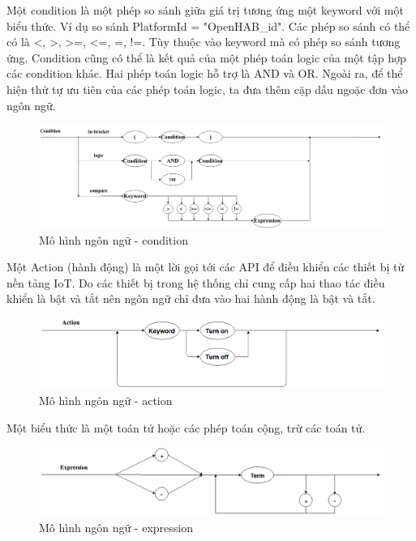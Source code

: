 Một condition là một phép so sánh giữa giá trị tương ứng một keyword với một biểu thức. Ví dụ so sánh PlatformId = "OpenHAB\_id". Các phép so sánh có thể có là <, >, >=, <=, =, !=. Tùy thuộc vào keyword mà có phép so sánh tương ứng. Condition cũng có thể là kết quả của một phép toán logic của một tập hợp các condition khác. Hai phép toán logic hỗ trợ là AND và OR. Ngoài ra, để thể hiện thứ tự ưu tiên của các phép toán logic, ta đưa thêm cặp dấu ngoặc đơn vào ngôn ngữ.

\begin{figure}[h!]
	\center
	\includegraphics[scale=0.3]{image/language_model-condition}
	\caption{Mô hình ngôn ngữ - condition}
\end{figure}


Một Action (hành động) là một lời gọi tới các API để điều khiển các thiết bị từ nền tảng IoT. Do các thiết bị trong hệ thống chỉ cung cấp hai thao tác điều khiển là bật và tắt nên ngôn ngữ chỉ đưa vào hai hành động là bật và tắt.

\begin{figure}[h!]
	\center
	\includegraphics[scale=0.4]{image/language_model-action}
	\caption{Mô hình ngôn ngữ - action}
\end{figure}


Một biểu thức là một toán tử hoặc các phép toán cộng, trừ các toán tử.
\begin{figure}[h!]
	\center
	\includegraphics[scale=0.4]{image/language_model-expression}
	\caption{Mô hình ngôn ngữ - expression}
\end{figure}

